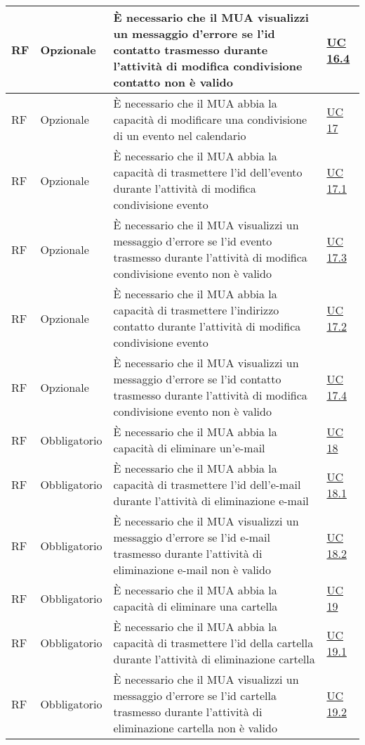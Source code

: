 \begin{longtable}{*{1}{>{\centering\arraybackslash}p{1.5cm}}*{1}{>{\centering\arraybackslash}p{2.5cm}}p{6cm}*{1}{>{\centering\arraybackslash}p{3cm}}}
    \\\hline
    RF & Opzionale & È necessario che il MUA visualizzi un messaggio d'errore se l'id contatto trasmesso durante l'attività di modifica condivisione contatto non è valido & \hyperref[sec:UC16.4]{UC 16.4}
    \\\hline
    RF & Opzionale & È necessario che il MUA abbia la capacità di modificare una condivisione di un evento nel calendario & \hyperref[sec:UC17]{UC 17}
    \\\hline
    RF & Opzionale & È necessario che il MUA abbia la capacità di trasmettere l'id dell'evento durante l'attività di modifica condivisione evento & \hyperref[sec:UC17.1]{UC 17.1}
    \\\hline
    RF & Opzionale & È necessario che il MUA visualizzi un messaggio d'errore se l'id evento trasmesso durante l'attività di modifica condivisione evento non è valido & \hyperref[sec:UC17.3]{UC 17.3}
    \\\hline
    RF & Opzionale & È necessario che il MUA abbia la capacità di trasmettere l'indirizzo contatto durante l'attività di modifica condivisione evento & \hyperref[sec:UC17.2]{UC 17.2}
    \\\hline
    RF & Opzionale & È necessario che il MUA visualizzi un messaggio d'errore se l'id contatto trasmesso durante l'attività di modifica condivisione evento non è valido & \hyperref[sec:UC17.4]{UC 17.4}
    \\\hline
    RF & Obbligatorio & È necessario che il MUA abbia la capacità di eliminare un'e-mail & \hyperref[sec:UC18]{UC 18}
    \\\hline
    RF & Obbligatorio & È necessario che il MUA abbia la capacità di trasmettere l'id dell'e-mail durante l'attività di eliminazione e-mail & \hyperref[sec:UC18.1]{UC 18.1}
    \\\hline
    RF & Obbligatorio & È necessario che il MUA visualizzi un messaggio d'errore se l'id e-mail trasmesso durante l'attività di eliminazione e-mail non è valido & \hyperref[sec:UC18.2]{UC 18.2}
    \\\hline
    RF & Obbligatorio & È necessario che il MUA abbia la capacità di eliminare una cartella & \hyperref[sec:UC19]{UC 19}
    \\\hline
    RF & Obbligatorio & È necessario che il MUA abbia la capacità di trasmettere l'id della cartella durante l'attività di eliminazione cartella & \hyperref[sec:UC19.1]{UC 19.1}
    \\\hline
    RF & Obbligatorio & È necessario che il MUA visualizzi un messaggio d'errore se l'id cartella trasmesso durante l'attività di eliminazione cartella non è valido & \hyperref[sec:UC19.2]{UC 19.2}

\end{longtable}
